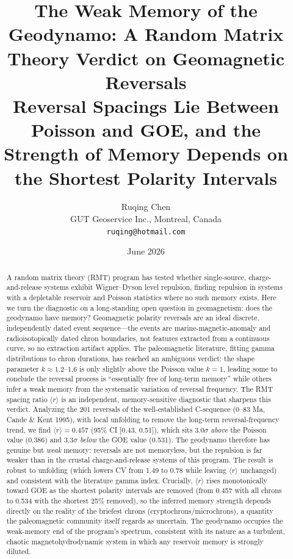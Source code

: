 \documentclass[12pt,a4paper]{article}
\title{\textbf{The Weak Memory of the Geodynamo: A Random Matrix Theory Verdict on Geomagnetic Reversals}\\[0.4em]
\large Reversal Spacings Lie Between Poisson and GOE, and the Strength of Memory Depends on the Shortest Polarity Intervals}
\author{Ruqing Chen\\ GUT Geoservice Inc., Montreal, Canada\\ \texttt{ruqing@hotmail.com}}
\date{June 2026}
\begin{document}
\maketitle

\begin{abstract}
\noindent A random matrix theory (RMT) program has tested whether single-source, charge-and-release systems exhibit Wigner--Dyson level repulsion, finding repulsion in systems with a depletable reservoir and Poisson statistics where no such memory exists. Here we turn the diagnostic on a long-standing open question in geomagnetism: does the geodynamo have memory? Geomagnetic polarity reversals are an ideal discrete, independently dated event sequence---the events are marine-magnetic-anomaly and radioisotopically dated chron boundaries, not features extracted from a continuous curve, so no extraction artifact applies. The paleomagnetic literature, fitting gamma distributions to chron durations, has reached an ambiguous verdict: the shape parameter $k\approx1.2$--$1.6$ is only slightly above the Poisson value $k=1$, leading some to conclude the reversal process is ``essentially free of long-term memory'' while others infer a weak memory from the systematic variation of reversal frequency. The RMT spacing ratio $\langle r\rangle$ is an independent, memory-sensitive diagnostic that sharpens this verdict. Analyzing the 201 reversals of the well-established C-sequence (0--83 Ma, Cande \& Kent 1995), with local unfolding to remove the long-term reversal-frequency trend, we find $\langle r\rangle = 0.457$ (95\% CI [0.43, 0.51]), which sits $3.0\sigma$ \emph{above} the Poisson value (0.386) and $3.3\sigma$ \emph{below} the GOE value (0.531). The geodynamo therefore has genuine but \emph{weak} memory: reversals are not memoryless, but the repulsion is far weaker than in the crustal charge-and-release systems of this program. The result is robust to unfolding (which lowers CV from 1.49 to 0.78 while leaving $\langle r\rangle$ unchanged) and consistent with the literature gamma index. Crucially, $\langle r\rangle$ rises monotonically toward GOE as the shortest polarity intervals are removed (from 0.457 with all chrons to 0.534 with the shortest 25\% removed), so the inferred memory strength depends directly on the reality of the briefest chrons (cryptochrons/microchrons), a quantity the paleomagnetic community itself regards as uncertain. The geodynamo occupies the weak-memory end of the program's spectrum, consistent with its nature as a turbulent, chaotic magnetohydrodynamic system in which any reservoir memory is strongly diluted.


\end{abstract}
\end{document}
